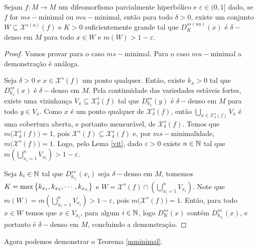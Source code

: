 \begin{proposicao}\label{deltadensoMS} Sejam $f:M\to M$ um difeomorfismo parcialmente hiperbólico e $\varepsilon\in(0,1]$ dado, se $f$ for $ms-$minimal ou $mu-$minimal, então para todo $\delta>0$, existe um conjunto $W\subseteq\mathcal{X}^{s(u)}(f)$ e $K>0$ suficientemente grande tal que $D_K^{ss(uu)}(x)$ é $\delta-$denso em $M$ para todo $x\in W$ e $m(W)>1-\varepsilon$. 
\end{proposicao}

\begin{proof} Vamos provar para o caso $ms-$minimal. Para o caso $mu-$minimal a demonstração é análoga.

Seja $\delta>0$ e $x\in\mathcal{X}^s(f)$ um ponto qualquer. Então, existe $k_x>0$ tal que $D^{ss}_{k_x}(x)$ é $\delta-$denso em $M$. Pela continuidade das variedades estáveis fortes, existe uma vizinhança $V_x\subseteq \mathcal{X}^s_{\delta}(f)$ tal que $D^{ss}_{k_x}(y)$ é $\delta-$denso em $M$ para todo $y\in V_x$. Como $x$ é um ponto qualquer de $\mathcal{X}^s_{\delta}(f)$, então $\bigcup_{x\in \mathcal{X}^s_{\delta}(f)}V_x$ é uma cobertura aberta, e portanto mensurável, de $\mathcal{X}^s_{\delta}(f)$. Temos que $m\big(\mathcal{X}^s_{\delta}(f)\big)=1$, pois $\mathcal{X}^s(f)\subseteq \mathcal{X}^s_{\delta}(f)$ e, por $ms-$minimalidade, $m\big(\mathcal{X}^s(f)\big)=1$. Logo, pelo Lema \ref{vit}, dado $\varepsilon>0$ existe $n\in \mathbb{N}$ tal que $m\left(\bigcup_{x_i=1}^{n}V_{x_i}\right)>1-\varepsilon$. 

Seja $k_i\in\mathbb{N}$ tal que $D_{k_{x_i}}^{ss}(x_i)$ seja $\delta-$denso em $M$, tomemos $K=\max\big\{k_{x_1},k_{x_2},\cdots,k_{x_n}\big\}$ e $W=\mathcal{X}^s(f)\cap\left(\bigcup_{x_i=1}^{n}V_{x_i}\right)$. Note que $m(W)=m\left(\bigcup_{x_i=1}^{n}V_{x_i}\right)>1-\varepsilon$, pois $m\big(\mathcal{X}^s(f)\big)=1$. Então, para todo $x\in W$ temos que $x\in V_{x_i}$, para algum $i\in\mathbb{N}$, logo $D_{K}^{ss}(x)$ contém $D_{k_{x_i}}^{ss}(x)$, e portanto é $\delta-$denso em $M$, concluindo a demonstração. 
\end{proof}

Agora podemos demonstrar o Teorema \ref{mminimal}.

